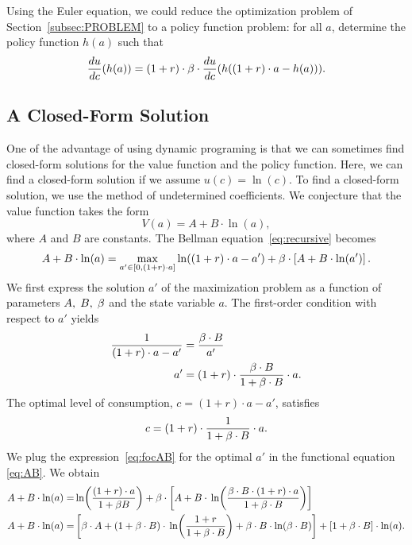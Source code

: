 \documentclass[letterpaper,12pt,leqno]{article}
\begin{document}
Using the Euler equation, we could reduce the optimization problem of Section~\ref{subsec:PROBLEM} to a policy function problem: for all $a$, determine the policy function $h(a)$ such that
\begin{equation*}
\frac{d u}{d c}(h(a))=(1+r)\cdot \beta \cdot  \frac{d u}{d c}(h((1+r)\cdot a-h(a))).
\end{equation*}

\subsection{A Closed-Form Solution}\label{guess}

One of the advantage of using dynamic programing is that we can sometimes find closed-form solutions for the value function and the policy function. Here, we can find a closed-form solution if we assume $u(c)=\ln(c)$. To find a closed-form solution, we use the method of undetermined coefficients. We conjecture that the value function takes the form
\begin{equation}
V(a)=A+B \cdot \ln(a)\label{eq:fun},
\end{equation}
where $A$ and $B$ are constants. The Bellman equation~\eqref{eq:recursive} becomes
\begin{equation}
A+B \cdot \ln(a)=\max_{a'\in[0,(1+r)\cdot a]}\ln((1+r)\cdot a-a')+\b  \cdot \bs{A+B \cdot \ln(a')}\label{eq:AB}.
\end{equation}
We first express the solution $a'$ of the maximization problem as a function of parameters $A,\;B,\;\beta$ and the state variable $a$. The first-order condition with respect to $a'$ yields
\begin{align}
\frac{1}{(1+r)\cdot a-a'}&=\frac{\beta  \cdot B}{a'}\nonumber\\
a'&=(1+r)\cdot \frac{\beta  \cdot B}{1+\beta \cdot  B} \cdot a \label{eq:focAB}.
\end{align}
The optimal level of consumption, $c=(1+r)\cdot a-a'$,  satisfies
\[c=(1+r)\cdot \frac{1}{1+\beta \cdot  B} \cdot a. \]
We plug the expression~\eqref{eq:focAB} for the optimal $a'$ in the functional equation \eqref{eq:AB}. We obtain
\begin{align*}
A+B\cdot\ln(a)=&\ln{\frac{(1+r)\cdot a}{1+\b B}}+\b\cdot \bs{A+B\cdot \ln{\frac{\b \cdot B  \cdot (1+r)\cdot a}{1+\b  \cdot  B}}}\\
A+B\cdot\ln(a)=&\bs{ \b  \cdot A+ (1+\b \cdot  B)\cdot \ln{\frac{1+r}{1+\b \cdot B}}+\b  \cdot B \cdot  \ln(\b \cdot  B)} + \bs{ 1+\b  \cdot B}\cdot  \ln(a).
\end{align*}
\end{document}
